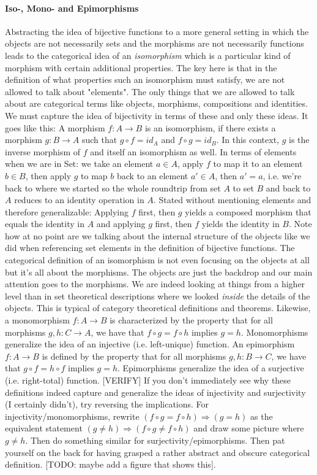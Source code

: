 \paragraph{Iso-, Mono- and Epimorphisms}
Abstracting the idea of bijective functions to a more general setting in which the objects are not necessarily sets and the morphisms are not necessarily functions leads to the categorical idea of an \emph{isomorphism} which is a particular kind of morphism with certain additional properties. The key here is that in the definition of what properties such an isomorphism must satisfy, we are not allowed to talk about "elements". The only things that we are allowed to talk about are categorical terms like objects, morphisms, compositions and identities. We must capture the idea of bijectivity in terms of these and only these ideas. It goes like this: A morphism $f: A \rightarrow B$ is an isomorphism, if there exists a morphism $g: B \rightarrow A$ such that $g \circ f = id_A$ and  $f \circ g = id_B$. In this context, $g$ is the inverse morphism of $f$ and itself an isomorphism as well. In terms of elements when we are in Set: we take an element $a \in A$, apply $f$ to map it to an element $b \in B$, then apply $g$ to map $b$ back to an element $a' \in A$, then $a' = a$, i.e. we're back to where we started so the whole roundtrip from set $A$ to set $B$ and back to $A$ reduces to an identity operation in $A$. Stated without mentioning elements and therefore generalizable: Applying $f$ first, then $g$ yields a composed morphism that equals the identity in $A$ and applying $g$ first, then $f$ yields the identity in $B$. Note how at no point are we talking about the internal structure of the objects like we did when referencing set elements in the definition of bijective functions. The categorical definition of an isomorphism is not even focusing on the objects at all but it's all about the morphisms. The objects are just the backdrop and our main attention goes to the morphisms. We are indeed looking at things from a higher level than in set theoretical descriptions where we looked \emph{inside} the details of the objects. This is typical of category theoretical definitions and theorems. Likewise, a monomorphism $f: A \rightarrow B$ is characterized by the property that for all morphisms $g,h: C \rightarrow A$, we have that $f \circ g = f \circ h$ implies $g = h$. Monomorphisms generalize the idea of an injective (i.e. left-unique) function. An epimorphism $f: A \rightarrow B$ is defined by the property that for all morphisms $g,h: B \rightarrow C$, we have that $g \circ f = h \circ f$ implies $g = h$. Epimorphisms generalize the idea of a surjective (i.e. right-total) function. [VERIFY] If you don't immediately see why these definitions indeed capture and generalize the ideas of injectivity and surjectivity (I certainly didn't), try reversing the implications. For injectivity/monomorphisms, rewrite $(f \circ g = f \circ h) \Rightarrow (g = h)$ as the equivalent statement $(g \neq h) \Rightarrow (f \circ g \neq f \circ h)$ and draw some picture where $g \neq h$. Then do something similar for surjectivity/epimorphisms. Then pat yourself on the back for having grasped a rather abstract and obscure categorical definition. [TODO: maybe add a figure that shows this].
